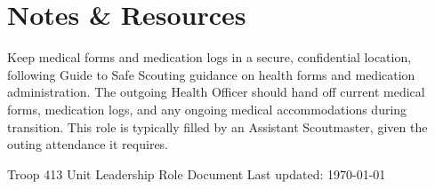 \documentclass[11pt, letterpaper]{article}
\begin{document}
\vspace{0.6em}

\section{Notes \& Resources}
Keep medical forms and medication logs in a secure, confidential location, following Guide to Safe Scouting guidance on health forms and medication administration. The outgoing Health Officer should hand off current medical forms, medication logs, and any ongoing medical accommodations during transition. This role is typically filled by an Assistant Scoutmaster, given the outing attendance it requires.

\vfill
\begin{center}
  \footnotesize\color{gray}
  Troop 413 \textbullet{} Unit Leadership Role Document \textbullet{} Last updated: \today
\end{center}
\end{document}
